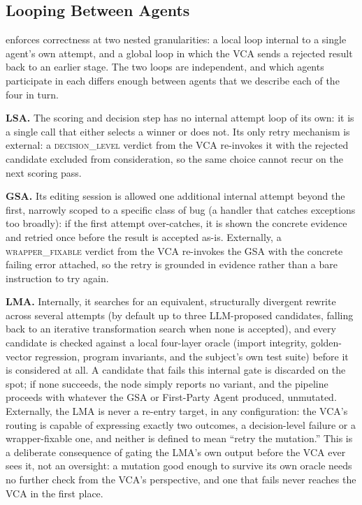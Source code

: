 \subsection{Looping Between Agents}
\label{sec:looping}

\sys enforces correctness at two nested granularities: a local loop internal to a single agent's own attempt, and a global loop in which the VCA sends a rejected result back to an earlier stage. The two loops are independent, and which agents participate in each differs enough between agents that we describe each of the four in turn.

\textbf{LSA.} The scoring and decision step has no internal attempt loop of its own: it is a single call that either selects a winner or does not. Its only retry mechanism is external: a \textsc{decision\_level} verdict from the VCA re-invokes it with the rejected candidate excluded from consideration, so the same choice cannot recur on the next scoring pass.

\textbf{GSA.} Its editing session is allowed one additional internal attempt beyond the first, narrowly scoped to a specific class of bug (a handler that catches exceptions too broadly): if the first attempt over-catches, it is shown the concrete evidence and retried once before the result is accepted as-is. Externally, a \textsc{wrapper\_fixable} verdict from the VCA re-invokes the GSA with the concrete failing error attached, so the retry is grounded in evidence rather than a bare instruction to try again.

\textbf{LMA.} Internally, it searches for an equivalent, structurally divergent rewrite across several attempts (by default up to three LLM-proposed candidates, falling back to an iterative transformation search when none is accepted), and every candidate is checked against a local four-layer oracle (import integrity, golden-vector regression, program invariants, and the subject's own test suite) before it is considered at all. A candidate that fails this internal gate is discarded on the spot; if none succeeds, the node simply reports no variant, and the pipeline proceeds with whatever the GSA or First-Party Agent produced, unmutated. Externally, the LMA is never a re-entry target, in any configuration: the VCA's routing is capable of expressing exactly two outcomes, a decision-level failure or a wrapper-fixable one, and neither is defined to mean ``retry the mutation.'' This is a deliberate consequence of gating the LMA's own output before the VCA ever sees it, not an oversight: a mutation good enough to survive its own oracle needs no further check from the VCA's perspective, and one that fails never reaches the VCA in the first place.

